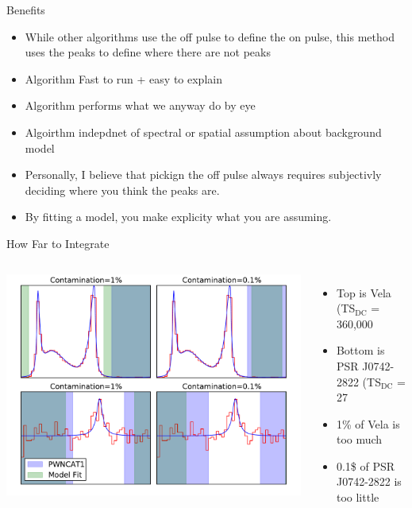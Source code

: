 \documentclass[12pt]{beamer}
\begin{document}
\begin{frame}{Benefits}
  \begin{itemize}
    \item While other algorithms use the off pulse to define
      the on pulse, this method uses the peaks to
      define where there are not peaks
    \item Algorithm Fast to run + easy to explain
    \item Algorithm performs what we anyway do by eye 
    \item Algoirthm indepdnet of spectral or spatial assumption about background model 
    \item Personally, I believe that pickign the off pulse
      always requires subjectivly deciding where you think the peaks are.
    \item By fitting a model, you make explicity what you are assuming.
  \end{itemize}

\end{frame}



\begin{frame}{How Far to Integrate}

\begin{columns}

  \includegraphics[width=1\textwidth]{plots/how_far_to_integrate.pdf}
  \begin{itemize}
    \item   Top is Vela (TS$_\text{DC}$ = 360,000
    \item Bottom is PSR J0742-2822 (TS$_\text{DC}$ = 27
    \item 1\% of Vela is too much
    \item 0.1\$ of PSR J0742-2822 is too little
  \end{itemize}
\end{columns}
\end{frame}
    
\end{document}
